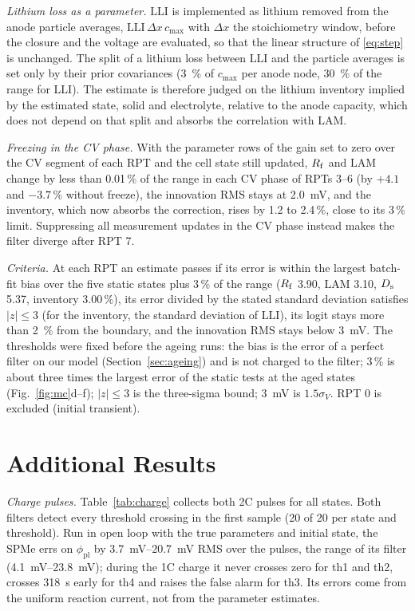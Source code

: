 \documentclass[journal]{IEEEtran}
\newcommand{\LAM}{\mathrm{LAM}}\newcommand{\LLI}{\mathrm{LLI}}\newcommand{\phipl}{\phi_{\mathrm{pl}}}
\begin{document}
\emph{Lithium loss as a parameter.} $\LLI$ is implemented as lithium removed from the anode particle averages, $\LLI\,\Delta x\,c_{\max}$ with $\Delta x$ the stoichiometry window, before the closure and the voltage are evaluated, so that the linear structure of \eqref{eq:step} is unchanged. The split of a lithium loss between $\LLI$ and the particle averages is set only by their prior covariances (\SI{3}{\percent} of $c_{\max}$ per anode node, \SI{30}{\percent} of the range for $\LLI$). The estimate is therefore judged on the lithium inventory implied by the estimated state, solid and electrolyte, relative to the anode capacity, which does not depend on that split and absorbs the correlation with $\LAM$.

\emph{Freezing in the CV phase.} With the parameter rows of the gain set to zero over the CV segment of each RPT and the cell state still updated, $R_{\mathrm{f}}$ and $\LAM$ change by less than 0.01\,\% of the range in each CV phase of RPTs 3--6 (by $+4.1$ and $-3.7$\,\% without freeze), the innovation RMS stays at \SI{2.0}{\milli\volt}, and the inventory, which now absorbs the correction, rises by 1.2 to 2.4\,\%, close to its 3\,\% limit. Suppressing all measurement updates in the CV phase instead makes the filter diverge after RPT 7.

\emph{Criteria.} At each RPT an estimate passes if its error is within the largest batch-fit bias over the five static states plus 3\,\% of the range ($R_{\mathrm{f}}$ 3.90, $\LAM$ 3.10, $D_{\mathrm{s}}$ 5.37, inventory 3.00\,\%), its error divided by the stated standard deviation satisfies $|z|\le3$ (for the inventory, the standard deviation of $\LLI$), its logit stays more than \SI{2}{\percent} from the boundary, and the innovation RMS stays below \SI{3}{\milli\volt}. The thresholds were fixed before the ageing runs: the bias is the error of a perfect filter on our model (Section~\ref{sec:ageing}) and is not charged to the filter; 3\,\% is about three times the largest error of the static tests at the aged states (Fig.~\ref{fig:mc}d--f); $|z|\le3$ is the three-sigma bound; \SI{3}{\milli\volt} is $1.5\sigma_V$. RPT 0 is excluded (initial transient).

\section{Additional Results}\label{app:results}
\emph{Charge pulses.} Table~\ref{tab:charge} collects both 2C pulses for all states. Both filters detect every threshold crossing in the first sample (20 of 20 per state and threshold). Run in open loop with the true parameters and initial state, the SPMe errs on $\phipl$ by \SIrange{3.7}{20.7}{\milli\volt} RMS over the pulses, the range of its filter (\SIrange{4.1}{23.8}{\milli\volt}); during the 1C charge it never crosses zero for th1 and th2, crosses \SI{318}{\second} early for th4 and raises the false alarm for th3. Its errors come from the uniform reaction current, not from the parameter estimates.
\end{document}
